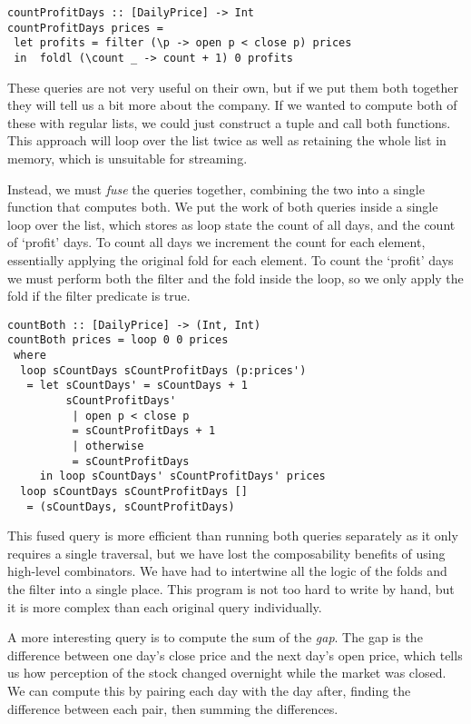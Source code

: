 \begin{lstlisting}
countProfitDays :: [DailyPrice] -> Int
countProfitDays prices =
 let profits = filter (\p -> open p < close p) prices
 in  foldl (\count _ -> count + 1) 0 profits
\end{lstlisting}

These queries are not very useful on their own, but if we put them both together they will tell us a bit more about the company.
If we wanted to compute both of these with regular lists, we could just construct a tuple and call both functions.
This approach will loop over the list twice as well as retaining the whole list in memory, which is unsuitable for streaming.

Instead, we must \emph{fuse} the queries together, combining the two into a single function that computes both.
We put the work of both queries inside a single loop over the list, which stores as loop state the count of all days, and the count of `profit' days.
To count all days we increment the count for each element, essentially applying the original fold for each element.
To count the `profit' days we must perform both the filter and the fold inside the loop, so we only apply the fold if the filter predicate is true.

\begin{lstlisting}
countBoth :: [DailyPrice] -> (Int, Int)
countBoth prices = loop 0 0 prices
 where
  loop sCountDays sCountProfitDays (p:prices')
   = let sCountDays' = sCountDays + 1
         sCountProfitDays'
          | open p < close p
          = sCountProfitDays + 1
          | otherwise
          = sCountProfitDays
     in loop sCountDays' sCountProfitDays' prices
  loop sCountDays sCountProfitDays []
   = (sCountDays, sCountProfitDays)
\end{lstlisting}

This fused query is more efficient than running both queries separately as it only requires a single traversal, but we have lost the composability benefits of using high-level combinators.
We have had to intertwine all the logic of the folds and the filter into a single place.
This program is not too hard to write by hand, but it is more complex than each original query individually.

A more interesting query is to compute the sum of the \emph{gap}.
The gap is the difference between one day's close price and the next day's open price, which tells us how perception of the stock changed overnight while the market was closed.
We can compute this by pairing each day with the day after, finding the difference between each pair, then summing the differences.

